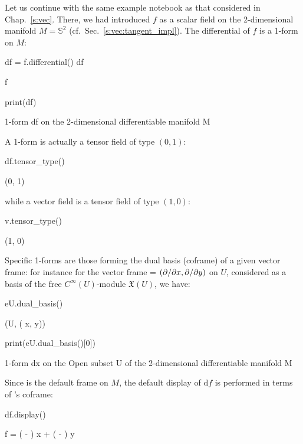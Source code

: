 Let us continue with the same example notebook as that considered in
Chap.~\ref{s:vec}. There, we had introduced $f$ as a scalar field on
the 2-dimensional manifold $M = \mathbb{S}^2$ (cf.\ Sec.~\ref{s:vec:tangent_impl}).
The differential of $f$ is a 1-form on $M$:
\begin{NBin}
df = f.differential()
df
\end{NBin}
\begin{NBoutM}
f
\end{NBoutM}
\begin{NBin}
print(df)
\end{NBin}
\begin{NBprint}
1-form df on the 2-dimensional differentiable manifold M
\end{NBprint}
A 1-form is actually a tensor field of type $(0,1)$:
\begin{NBin}
df.tensor_type()
\end{NBin}
\begin{NBoutM}
\left(0, 1\right)
\end{NBoutM}
while a vector field is a tensor field of type $(1,0)$:
\begin{NBin}
v.tensor_type()
\end{NBin}
\begin{NBoutM}
\left(1, 0\right)
\end{NBoutM}
Specific 1-forms are those forming the dual basis (coframe) of a given vector
frame: for instance for the vector frame  = $({\partial }/{\partial x},{\partial }/{\partial y})$
on $U$, considered as a basis of the free $C^\infty(U)$-module $\mathfrak{X}(U)$,
we have:
\begin{NBin}
eU.dual_basis()
\end{NBin}
\begin{NBoutM}
\left(U, \left( x, y\right)\right)
\end{NBoutM}
\begin{NBin}
print(eU.dual_basis()[0])
\end{NBin}
\begin{NBprint}
1-form dx on the Open subset U of the 2-dimensional differentiable manifold M
\end{NBprint}
Since  is the default frame on $M$, the default display of $\mathrm{d}f$
is performed in terms of 's coframe:
\begin{NBin}
df.display()
\end{NBin}
\begin{NBoutM}
f = \left( - \right)  x + \left( - \right)  y
\end{NBoutM}
